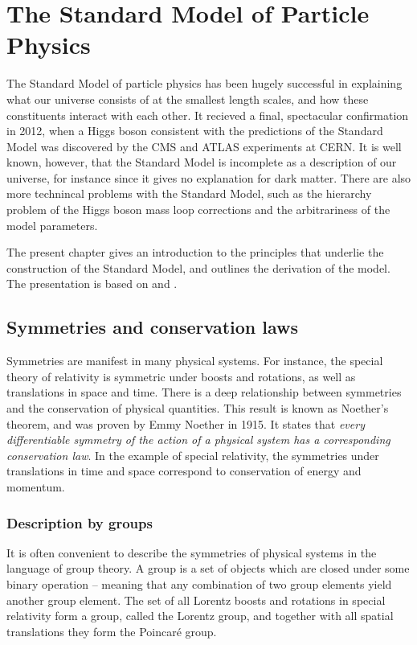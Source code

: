 \chapter{The Standard Model of Particle Physics}%
\label{ch:SM_intro}
The Standard Model of particle physics has been hugely successful in explaining what our universe consists of at the smallest length scales, and how these constituents interact with each other. It recieved a final, spectacular confirmation in 2012, when a Higgs boson consistent with the predictions of the Standard Model was discovered by the CMS and ATLAS experiments at CERN. It is well known, however, that the Standard Model is incomplete as a description of our universe, for instance since it gives no explanation for dark matter. There are also more technincal problems with the Standard Model, such as the hierarchy problem of the Higgs boson mass loop corrections and the arbitrariness of the model parameters.

The present chapter gives an introduction to the principles that underlie the construction of the Standard Model, and outlines the derivation of the model. The presentation is based on \cite{Mandl-Shaw} and \cite{Peskin-Schroeder}.

\section{Symmetries and conservation laws}
Symmetries are manifest in many physical systems. For instance, the special theory of relativity is symmetric under boosts and rotations, as well as translations in space and time. There is a deep relationship between symmetries and the conservation of physical quantities. This result is known as Noether's theorem, and was proven by Emmy Noether in 1915. It states that {\it every differentiable symmetry of the action of a physical system has a corresponding conservation law}. In the example of special relativity, the symmetries under translations in time and space correspond to conservation of energy and momentum.%

\subsection{Description by groups}
It is often convenient to describe the symmetries of physical systems in the language of group theory. A group is a set of objects which are closed under some binary operation -- meaning that any combination of two group elements yield another group element. The set of all Lorentz boosts and rotations in special relativity form a group, called the Lorentz group, and together with all spatial translations they form the Poincar\'{e} group. 

